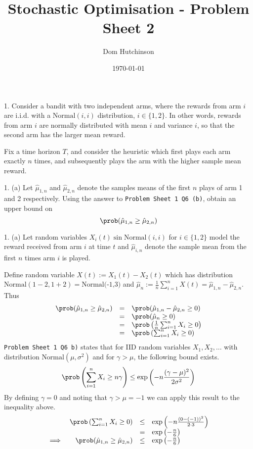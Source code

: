 \documentclass[11pt,a4paper]{article}
\begin{document}

\title{Stochastic Optimisation - Problem Sheet 2}
\author{Dom Hutchinson}
\date{\today}
\maketitle

\begin{question}{1.}
  Consider a bandit with two independent arms, where the rewards from arm $i$ are i.i.d. with a $\text{Normal}(i, i)$ distribution, $i\in\{1,2\}$. In other words, rewards from arm $i$ are normally distributed with mean $i$ and variance $i$, so that the second arm has the larger mean reward.
  \par Fix a time horizon $T$, and consider the heuristic which first plays each arm exactly $n$ times, and subsequently plays the arm with the higher sample mean reward.
\end{question}

\begin{question}{1. (a)}
  Let $\hat\mu_{1,n}$ and $\hat\mu_{2,n}$ denote the samples means of the first $n$ plays of arm 1 and 2 respectively. Using the answer to \texttt{Problem Sheet 1 Q6 (b)}, obtain an upper bound on
  \[ \prob(\hat\mu_{1,n}\geq\hat\mu_{2,n}) \]
\end{question}

\begin{answer}{1. (a)}
  Let random variables $X_i(t)\sin\text{Normal}(i,i)$ for $i\in\{1,2\}$ model the reward received from arm $i$ at time $t$ and $\hat\mu_{i,n}$ denote the sample mean from the first $n$ times arm $i$ is played.
  \par Define random variable $X(t):=X_1(t)-X_2(t)$ which has distribution $\text{Normal}(1-2,1+2)=\text{Normal(-1,3)}$ and $\hat\mu_n:=\frac1n\sum_{i=1}^nX(t)=\hat\mu_{1,n}-\hat\mu_{2,n}$. Thus
  \[\begin{array}{rcl}
    \prob(\hat\mu_{1,n}\geq\hat\mu_{2,n})&=&\prob(\hat\mu_{1,n}-\hat\mu_{2,n}\geq0)\\
    &=&\prob(\hat\mu_n\geq0)\\
    &=&\prob\left(\frac1n\sum_{i=1}^nX_i\geq0\right)\\
    &=&\prob\left(\sum_{i=1}^nX_i\geq0\right)
  \end{array}\]
  \texttt{Problem Sheet 1 Q6 b)} states that for IID random variables $X_1,X_2,\dots$ with distribution $\text{Normal}(\mu,\sigma^2)$ and for $\gamma>\mu$, the following bound exists.
  \[ \prob\left(\sum_{i=1}^nX_i\geq n\gamma\right)\leq\exp\left(-n\frac{(\gamma-\mu)^2}{2\sigma^2}\right) \]
  By defining $\gamma=0$ and noting that $\gamma>\mu=-1$ we can apply this result to the inequality above.
  \[\begin{array}{rrcl}
    &\prob\left(\sum_{i=1}^nX_i\geq0\right)&\leq&\exp\left(-n\frac{(0-(-1))^2}{2\cdot3}\right)\\
    &&=&\exp\left(-\frac{n}6\right)\\
    \implies&\prob(\hat\mu_{1,n}\geq\hat\mu_{2,n})&\leq&\exp\left(-\frac{n}6\right)
  \end{array}\]
\end{answer}
\end{document}
